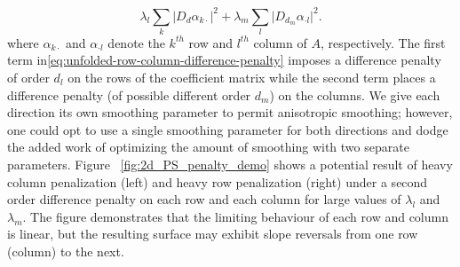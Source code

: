 \documentclass[12pt]{article}
\newcommand{\ms}{\scriptscriptstyle}
\theoremstyle{definition}
\begin{document}
\begin{equation}\label{eq:unfolded-row-column-difference-penalty}
\lambda_l \sum_{k} \vert D_d \alpha_{k \cdot} \vert^2 + \lambda_m \sum_{l} \vert D_{\ms d_{\ms m}} \alpha_{\cdot l} \vert^2 .
\end{equation}
\noindent
where $\alpha_{k \cdot}$ and $\alpha_{\cdot l}$ denote the $k^{th}$ row and $l^{th}$ column of $A$, respectively. The first term in\ref{eq:unfolded-row-column-difference-penalty} imposes a difference penalty of order $d_{\ms l}$ on the rows of the coefficient matrix while the second term places a difference penalty (of possible different order $d_{\ms m}$) on the columns. We give each direction its own smoothing parameter to permit anisotropic smoothing; however, one could opt to use a single smoothing parameter for both directions and dodge the added work of optimizing the amount of smoothing with two separate parameters. Figure ~\ref{fig:2d_PS_penalty_demo} shows a potential result of heavy column penalization (left) and heavy row penalization (right) under a second order difference penalty on each row and each column for large values of $\lambda_l$ and $\lambda_m$. The figure demonstrates that the limiting behaviour of each row and column is linear, but the resulting surface may exhibit slope reversals from one row (column) to the next. 
\end{document}
